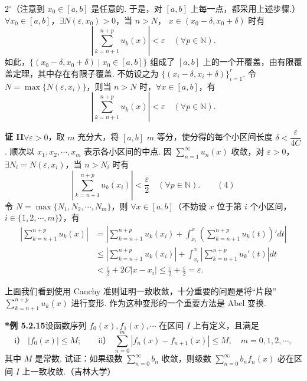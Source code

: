 \documentclass[UTF8, 12pt, fontset=fandol, oneside]{ctexart}
\begin{document}
$2^\circ$（注意到 $x_0\in[a,b]$ 是任意的. 于是，对 $[a,b]$ 上每一点，都采用上述步骤.）
$\forall x_0\in[a,b]$，$\exists N(\varepsilon,x_0)>0$，当 $n>N$，
$x\in(x_0-\delta,x_0+\delta)$ 时有
\[
  \left|\sum_{k=n+1}^{n+p}u_k(x)\right|<\varepsilon
  \quad(\forall p\in\mathbb N).
\]
如此，$\{(x_0-\delta,x_0+\delta)\mid x_0\in[a,b]\}$ 组成了 $[a,b]$ 上的一个开覆盖，由有限覆盖定理，其中存在有限子覆盖. 不妨设之为
$\{(x_i-\delta,x_i+\delta)\}_{i=1}^r$. 令
$N=\max\{N(\varepsilon,x_i)\}$，则当 $n>N$ 时，$\forall x\in[a,b]$，有
\[
  \left|\sum_{k=n+1}^{n+p}u_k(x)\right|<\varepsilon
  \quad(\forall p\in\mathbb N).
\]

\noindent\textbf{证 II}\quad $\forall\varepsilon>0$，取 $m$ 充分大，将 $[a,b]$ $m$ 等分，使分得的每个小区间长度
$\delta<\dfrac{\varepsilon}{4C}$. 顺次以 $x_1,x_2,\cdots,x_m$ 表示各小区间的中点. 因
$\displaystyle\sum_{n=1}^{\infty}u_n(x)$ 收敛，对 $\varepsilon>0$，$\exists N_i=N(\varepsilon,x_i)$，当
$n>N_i$ 时有
\[
  \left|\sum_{k=n+1}^{n+p}u_k(x_i)\right|<\frac{\varepsilon}{2}
  \quad(\forall p\in\mathbb N).
\qquad(4)
\]
令 $N=\max\{N_1,N_2,\cdots,N_m\}$，则 $\forall x\in[a,b]$（不妨设 $x$ 位于第 $i$ 个小区间，
$i\in\{1,2,\cdots,m\}$），有
\[
\begin{aligned}
\left|\sum_{k=n+1}^{n+p}u_k(x)\right|
&=\left|\sum_{k=n+1}^{n+p}u_k(x_i)
 +\int_{x_i}^x\left(\sum_{k=n+1}^{n+p}u_k(t)\right)'dt\right|\\
&\le\left|\sum_{k=n+1}^{n+p}u_k(x_i)\right|
 +\int_{x_i}^x\left|\sum_{k=n+1}^{n+p}u_k'(t)\right|dt\\
&<\frac{\varepsilon}{2}+2C|x-x_i|\le\frac{\varepsilon}{2}+\frac{\varepsilon}{2}=\varepsilon.
\end{aligned}
\]

上面我们看到使用 Cauchy 准则证明一致收敛，十分重要的问题是将“片段”
$\displaystyle\sum_{k=n+1}^{n+p}u_k(x)$ 进行变形. 作为这种变形的一个重要方法是 Abel 变换.

\noindent\textbf{*例 5.2.15}\quad 设函数序列 $f_0(x),f_1(x),\cdots$ 在区间 $I$ 上有定义，且满足
\[
  \text{i） }|f_0(x)|\le M;\qquad
  \text{ii） }\sum_{n=0}^m|f_n(x)-f_{n+1}(x)|\le M,\quad m=0,1,2,\cdots,
\]
其中 $M$ 是常数. 试证：如果级数 $\displaystyle\sum_{n=0}^{\infty}b_n$ 收敛，则级数
$\displaystyle\sum_{n=0}^{\infty}b_nf_n(x)$ 必在区间 $I$ 上一致收敛.（吉林大学）
\end{document}

